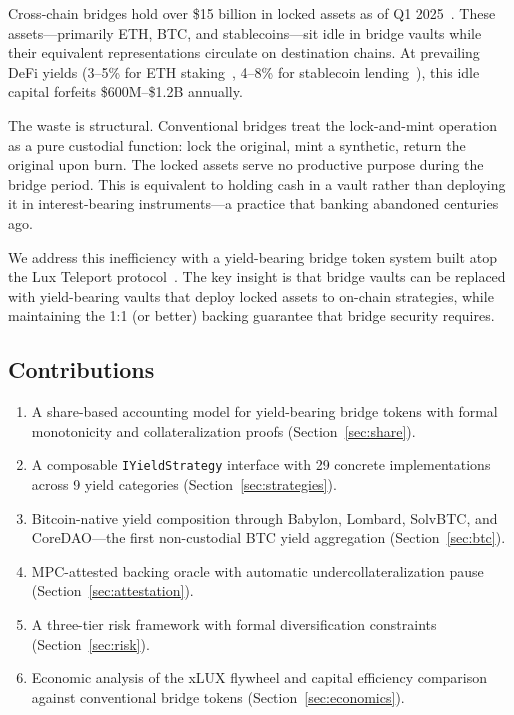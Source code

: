 \documentclass[11pt,twocolumn]{article}
\begin{document}
Cross-chain bridges hold over \$15 billion in locked assets as of Q1 2025~\cite{defillama2025}. These assets---primarily ETH, BTC, and stablecoins---sit idle in bridge vaults while their equivalent representations circulate on destination chains. At prevailing DeFi yields (3--5\% for ETH staking~\cite{lidofinance}, 4--8\% for stablecoin lending~\cite{aavev3}), this idle capital forfeits \$600M--\$1.2B annually.

The waste is structural. Conventional bridges treat the lock-and-mint operation as a pure custodial function: lock the original, mint a synthetic, return the original upon burn. The locked assets serve no productive purpose during the bridge period. This is equivalent to holding cash in a vault rather than deploying it in interest-bearing instruments---a practice that banking abandoned centuries ago.

We address this inefficiency with a yield-bearing bridge token system built atop the Lux Teleport protocol~\cite{luxteleport}. The key insight is that bridge vaults can be replaced with yield-bearing vaults that deploy locked assets to on-chain strategies, while maintaining the 1:1 (or better) backing guarantee that bridge security requires.

\subsection{Contributions}

\begin{enumerate}[nosep,leftmargin=1.5em]
  \item A share-based accounting model for yield-bearing bridge tokens with formal monotonicity and collateralization proofs (Section~\ref{sec:share}).
  \item A composable \texttt{IYieldStrategy} interface with 29 concrete implementations across 9 yield categories (Section~\ref{sec:strategies}).
  \item Bitcoin-native yield composition through Babylon, Lombard, SolvBTC, and CoreDAO---the first non-custodial BTC yield aggregation (Section~\ref{sec:btc}).
  \item MPC-attested backing oracle with automatic undercollateralization pause (Section~\ref{sec:attestation}).
  \item A three-tier risk framework with formal diversification constraints (Section~\ref{sec:risk}).
  \item Economic analysis of the xLUX flywheel and capital efficiency comparison against conventional bridge tokens (Section~\ref{sec:economics}).
\end{enumerate}
\end{document}

